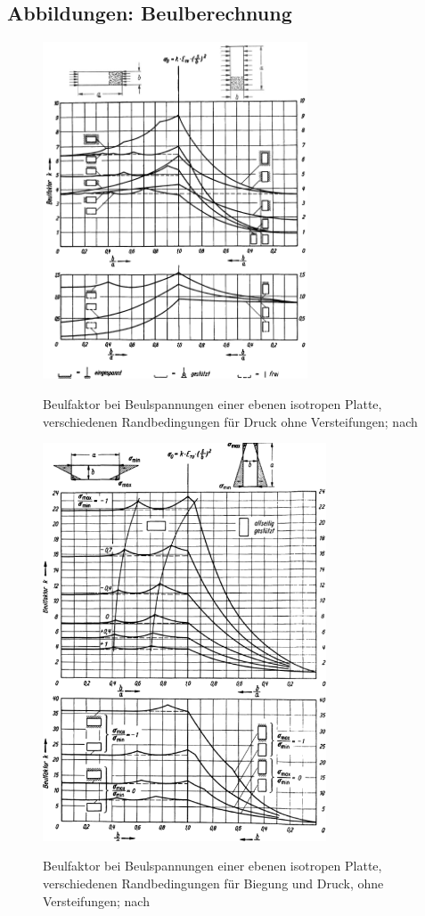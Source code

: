 \subsection{Abbildungen: Beulberechnung}
\begin{figure}[h]
	\centering
	\includegraphics[width=0.7\textwidth]{Bilder/Hertel Druck.png}
	\label{fig: Hertel_Druck}
	\caption{Beulfaktor bei Beulspannungen einer ebenen isotropen Platte, verschiedenen Randbedingungen für Druck ohne Versteifungen; nach \cite{item1}}
\end{figure}
\begin{figure}[h]
	\centering
	\includegraphics[width=0.75\textwidth]{Bilder/Hertel Biegung.png}
	\label{fig: Hertel_Biegung}
	\caption{Beulfaktor bei Beulspannungen einer ebenen isotropen Platte, verschiedenen Randbedingungen für Biegung und Druck, ohne Versteifungen; nach \cite{item1}}
\end{figure}

